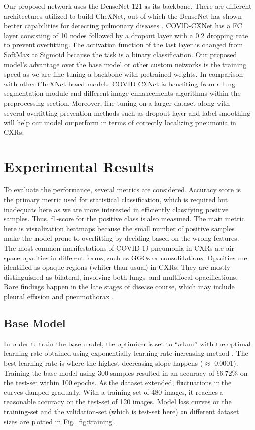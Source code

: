 \documentclass{article}
\begin{document}
\noindent Our proposed network uses the DenseNet-121 as its backbone. There are different architectures utilized to build CheXNet, out of which the DenseNet has shown better capabilities for detecting pulmonary diseases \cite{rajpurkar2017chexnet}. COVID-CXNet has a FC layer consisting of 10 nodes followed by a dropout layer with a 0.2 dropping rate to prevent overfitting. The activation function of the last layer is changed from SoftMax to Sigmoid because the task is a binary classification. Our proposed model's advantage over the base model or other custom networks is the training speed as we are fine-tuning a backbone with pretrained weights. In comparison with other CheXNet-based models, COVID-CXNet is benefiting from a lung segmentation module and different image enhancements algorithms within the preprocessing section. Moreover, fine-tuning on a larger dataset along with several overfitting-prevention methods such as dropout layer and label smoothing will help our model outperform in terms of correctly localizing pneumonia in CXRs.


\section{Experimental Results} \label{results}
To evaluate the performance, several metrics are considered. Accuracy score is the primary metric used for statistical classification, which is required but inadequate here as we are more interested in efficiently classifying positive samples. Thus, f1-score for the positive class is also measured. The main metric here is visualization heatmaps because the small number of positive samples make the model prone to overfitting by deciding based on the wrong features. The most common manifestations of COVID-19 pneumonia in CXRs are air-space opacities in different forms, such as GGOs or consolidations. Opacities are identified as opaque regions (whiter than usual) in CXRs. They are mostly distinguished as bilateral, involving both lungs, and multifocal opacifications. Rare findings happen in the late stages of disease course, which may include pleural effusion and pneumothorax \cite{jacobi2020portable}.






\subsection{Base Model} \label{base_model_res}
In order to train the base model, the optimizer is set to “adam” with the optimal learning rate obtained using exponentially learning rate increasing method \cite{smith2017cyclical}. The best learning rate is where the highest decreasing slope happens ($\approx$ 0.0001). Training the base model using 300 samples resulted in an accuracy of 96.72\% on the test-set within 100 epochs. As the dataset extended, fluctuations in the curves damped gradually. With a training-set of 480 images, it reaches a reasonable accuracy on the test-set of 120 images. Model loss curves on the training-set and the validation-set (which is test-set here) on different dataset sizes are plotted in Fig. \ref{fig:training}.
\end{document}

